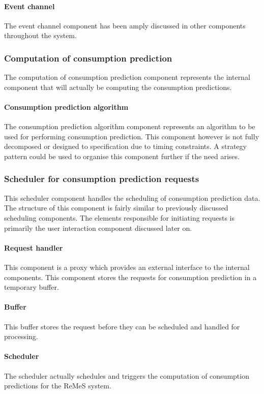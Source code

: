 \paragraph{Event channel}    
The event channel component has been amply discussed in other components throughout the system.
\subsubsection{Computation of consumption prediction}
The computation of consumption prediction component represents the internal component that will actually be computing the consumption predictions.
\paragraph{Consumption prediction algorithm}
The consumption prediction algorithm component represents an algorithm to be used for performing consumption prediction. This component however is not fully decomposed or designed to specification due to timing constraints. A strategy pattern could be used to organise this component further if the need arises. 
\subsubsection{Scheduler for consumption prediction requests}
This scheduler component handles the scheduling of consumption prediction data. 
The structure of this component is fairly similar to previously discussed scheduling components.
The elements responsible for initiating requests is primarily the user interaction component discussed later on.
\paragraph{Request handler} 
This component is a proxy which provides an external interface to the internal components.
This component stores the requests for consumption prediction in a temporary buffer.
\paragraph{Buffer} 
This buffer stores the request before they can be scheduled and handled for processing.
\paragraph{Scheduler} 
The scheduler actually schedules and triggers the computation of consumption predictions for the ReMeS system.
